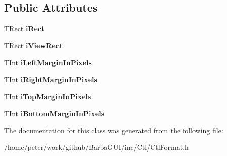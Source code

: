 \subsection*{Public Attributes}
\begin{DoxyCompactItemize}
\item 
\mbox{\label{classCCtlFormat_aadcdbf14d17e5e446173b407307fab3b}} 
T\+Rect {\bfseries i\+Rect}
\item 
\mbox{\label{classCCtlFormat_aca9e1ea2253d12e69f7db0ae7e79b94f}} 
T\+Rect {\bfseries i\+View\+Rect}
\item 
\mbox{\label{classCCtlFormat_a1c657d2edf7d6196d4ddbf4820e388ea}} 
T\+Int {\bfseries i\+Left\+Margin\+In\+Pixels}
\item 
\mbox{\label{classCCtlFormat_a9005ff7384eef41913705eace5b5b791}} 
T\+Int {\bfseries i\+Right\+Margin\+In\+Pixels}
\item 
\mbox{\label{classCCtlFormat_aab1d7db3ab83a8e38218ca820455963d}} 
T\+Int {\bfseries i\+Top\+Margin\+In\+Pixels}
\item 
\mbox{\label{classCCtlFormat_aba2f8ae6c857c1b9c6ffb3b1da95810b}} 
T\+Int {\bfseries i\+Bottom\+Margin\+In\+Pixels}
\end{DoxyCompactItemize}


The documentation for this class was generated from the following file\+:\begin{DoxyCompactItemize}
\item 
/home/peter/work/github/\+Barba\+G\+U\+I/inc/\+Ctl/Ctl\+Format.\+h\end{DoxyCompactItemize}
